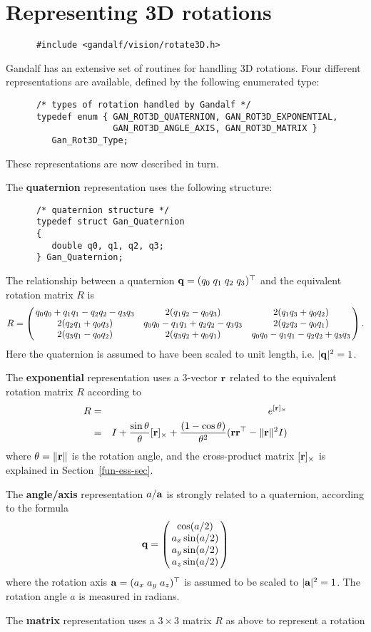 \section{Representing 3D rotations}
\begin{verbatim}
      #include <gandalf/vision/rotate3D.h>
\end{verbatim}
Gandalf has an extensive set of routines for handling 3D rotations.
Four different representations are available, defined by the following
enumerated type:
\begin{verbatim}
      /* types of rotation handled by Gandalf */
      typedef enum { GAN_ROT3D_QUATERNION, GAN_ROT3D_EXPONENTIAL,
                     GAN_ROT3D_ANGLE_AXIS, GAN_ROT3D_MATRIX }
         Gan_Rot3D_Type;
\end{verbatim}
These representations are now described in turn.
\begin{description}
  \item The {\bf quaternion} representation uses the following structure:
	\begin{verbatim}
      /* quaternion structure */
      typedef struct Gan_Quaternion
      {
         double q0, q1, q2, q3;
      } Gan_Quaternion;
	\end{verbatim}
	The relationship between a quaternion $\qvec=(q_0\;q_1\;q_2\;q_3)\tr$
	and the equivalent rotation matrix $R$ is
	\[
	 R = \beginm{ccc} q_0 q_0 + q_1 q_1-q_2 q_2 - q_3 q_3 & 2(q_1 q_2 - q_0 q_3) & 2(q_1 q_3 + q_0 q_2) \\
	               2(q_2 q_1 + q_0 q_3) & q_0 q_0 - q_1 q_1 + q_2 q_2 - q_3 q_3 & 2(q_2 q_3 - q_0 q_1) \\
	               2(q_3 q_1 - q_0 q_2) & 2(q_3 q_2 + q_0 q_1) & q_0 q_0 - q_1 q_1 - q_2 q_2 + q_3 q_3
	     \endm.
	\]
	Here the quaternion is assumed to have been scaled to unit length,
	i.e. $|\qvec|^2=1$.

  \item The {\bf exponential} representation uses a 3-vector $\rvec$
	related to the equivalent rotation matrix $R$ according to
	\begin{eqnarray}
	 R &=& e^{[\rvec]_{\times}} \nonumber \\
	   &=& I + \frac{\sin \theta}{\theta} [\rvec]_{\times} +
		 \frac{(1-\cos\theta)}{\theta^2} (\rvec\rvec\tr - \|\rvec\|^2 I)
		\nonumber
	\end{eqnarray}
	where $\theta = \|\rvec\|$ is the rotation angle, and the cross-product
	matrix $[\rvec]_{\times}$ is explained in Section~\ref{fun-ess-sec}.

  \item The {\bf angle/axis} representation $a/\avec$ is strongly related to a
	quaternion, according to the formula
	\[ \qvec = \beginm{c} \cos(a/2) \\ a_x\sin(a/2) \\ a_y\sin(a/2) \\ a_z\sin(a/2) \endm
	\]
	where the rotation axis $\avec=(a_x\;a_y\;a_z)\tr$ is assumed to be
	scaled to $|\avec|^2=1$. The rotation angle $a$ is measured in radians.

  \item The {\bf matrix} representation uses a $3\times 3$ matrix $R$ as
	above to represent a rotation
\end{description}
